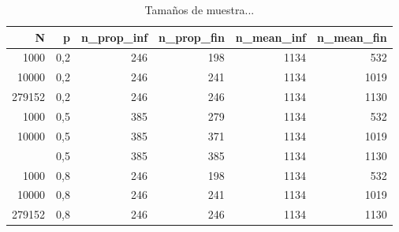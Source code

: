 \begin{table}

\caption{\label{tab:table-sample-sizes}Tamaños de muestra...}
\centering
\begin{tabular}[t]{rrrrrr}
\toprule
N & p & n\_prop\_inf & n\_prop\_fin & n\_mean\_inf & n\_mean\_fin\\
\midrule
1000 & 0,2 & 246 & 198 & 1134 & 532\\
10000 & 0,2 & 246 & 241 & 1134 & 1019\\
279152 & 0,2 & 246 & 246 & 1134 & 1130\\
1000 & 0,5 & 385 & 279 & 1134 & 532\\
10000 & 0,5 & 385 & 371 & 1134 & 1019\\
\addlinespace
279152 & 0,5 & 385 & 385 & 1134 & 1130\\
1000 & 0,8 & 246 & 198 & 1134 & 532\\
10000 & 0,8 & 246 & 241 & 1134 & 1019\\
279152 & 0,8 & 246 & 246 & 1134 & 1130\\
\bottomrule
\end{tabular}
\end{table}
